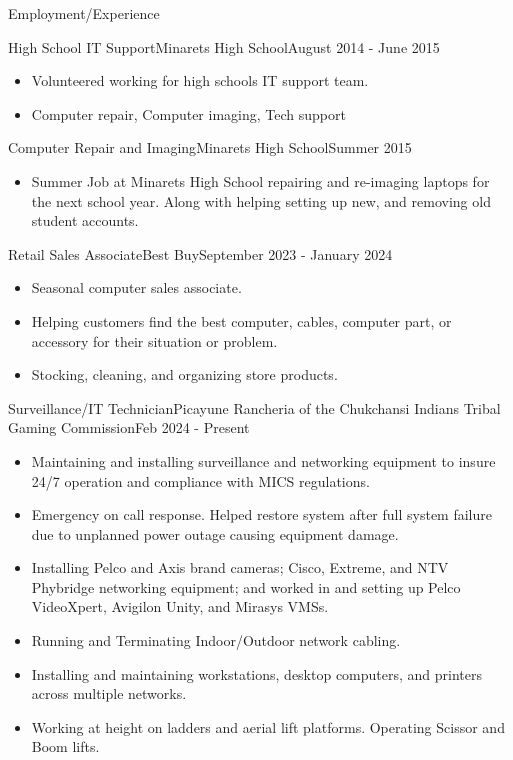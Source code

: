 \documentclass[]{mcdowellcvcustom}
\begin{document}
	\begin{cvsection}{Employment\slash Experience}
		\begin{cvsubsection}{High School IT Support}{Minarets High School}{August 2014 - June 2015}			
			\begin{itemize}
				\item Volunteered working for high schools IT support team. 
				\item Computer repair, Computer imaging, Tech support
			\end{itemize}
		\end{cvsubsection}
		\vspace{2mm}
		\begin{cvsubsection}{Computer Repair and Imaging}{Minarets High School}{Summer 2015}			
			\begin{itemize}
				\item Summer Job at Minarets High School repairing and re-imaging laptops for the next school year. Along with helping setting up new, and removing old student accounts.
			\end{itemize}
		\end{cvsubsection}
		\begin{cvsubsection}{Retail Sales Associate}{Best Buy}{September 2023 - January 2024}			
			\begin{itemize}
				\item Seasonal computer sales associate.
				\item Helping customers find the best computer, cables, computer part, or accessory for their situation or problem.
				\item Stocking, cleaning, and organizing store products.
			\end{itemize}
		\end{cvsubsection}
		\begin{cvsubsection}{Surveillance/IT Technician}{Picayune Rancheria of the Chukchansi Indians Tribal Gaming Commission}{Feb 2024 - Present}			
			\vspace{5mm}
			\begin{itemize}
				\item Maintaining and installing surveillance and  networking equipment to insure 24/7 operation and compliance with MICS regulations.
				\item Emergency on call response. Helped restore system after full system failure due to unplanned power outage causing equipment damage.
				\item Installing Pelco and Axis brand cameras; Cisco, Extreme, and NTV Phybridge networking equipment; and worked in and setting up Pelco VideoXpert, Avigilon Unity, and Mirasys VMSs.
				\item Running and Terminating Indoor/Outdoor network cabling.
				\item Installing and maintaining workstations, desktop computers, and printers across multiple networks.
				\item Working at height on ladders and aerial lift platforms. Operating Scissor and Boom lifts.
			\end{itemize}
		\end{cvsubsection}

	\end{cvsection}
	
\end{document}
